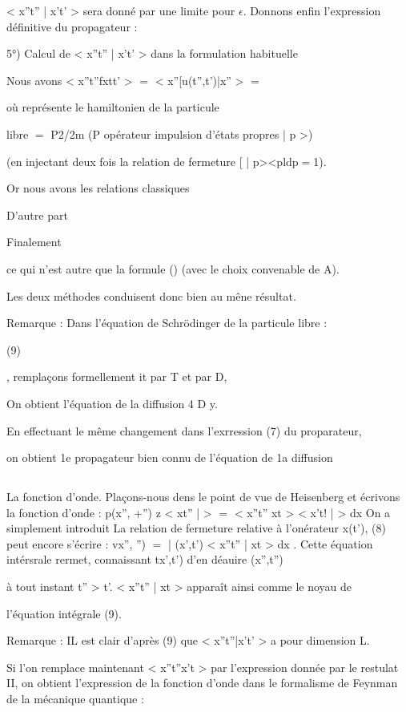 < x''t'' | x't' > sera donné par une limite pour $\epsilon$.
Donnons enfin l'expression définitive du propagateur :

5°) Calcul de < x''t'' | x't' > dans la formulation habituelle

 

Nous avons < x''t''fxtt' > $=$ < x''[u(t'',t')|x'' > $=$

 où  représente le hamiltonien de la particule

libre  $=$ P2/2m (P opérateur impulsion d'états propres | p >)


(en injectant deux fois la relation de fermeture [ | p><pldp$=$1).

Or nous avons les relations classiques

%

D'autre part

Finalement

ce qui n'est autre que la formule () (avec le choix convenable de A).

Les deux méthodes conduisent donc bien au mêne résultat.

Remarque : Dans l'équation de Schrödinger de la particule libre :

(9)

, remplaçons formellement it par T et par D,

On obtient l'équation de la diffusion 4 D y.

En effectuant le même changement dans l'exrression (7) du proparateur,

on obtient 1e propagateur bien connu de l'équation de 1a diffusion

\subsection{}La fonction d'onde.
Plaçons-nous dens le point de vue de Heisenberg et écrivons la
fonction d'onde :
p(x'', +'') z < xt'' |  > $=$  < x''t'' xt > < x't! |  > dx
On a simplement introduit La relation de fermeture relative à l'onérateur
x(t'),
(8) peut encore s'écrire :
vx'', '') $=$ |  (x',t') < x''t'' | xt > dx .
Cette équation intérsrale rermet, connaissant tx',t') d'en déauire (x'',t'')

à tout instant t'' > t'. < x''t'' | xt > apparaît ainsi comme le noyau de

l'équation intégrale (9).

%
Remarque : IL est clair d'après (9) que < x''t''|x't' > a pour dimension L.

Si l'on remplace maintenant < x''t''x't > par l'expression donnée par le
restulat II, on obtient l'expression de la fonction d'onde dans le formalisme de Feynman de la mécanique quantique :

